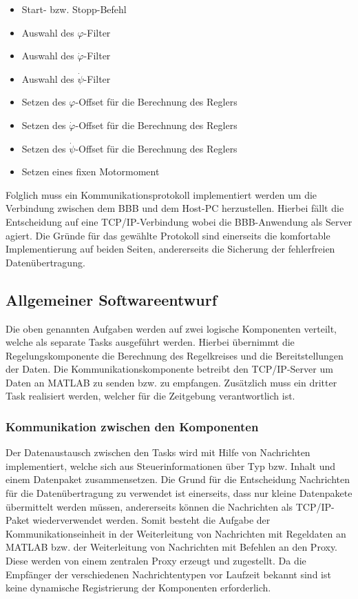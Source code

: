 \begin{itemize}
\setlength\itemsep{0em}
\item Start- bzw. Stopp-Befehl
\item Auswahl des $\varphi$-Filter
\item Auswahl des $\dot{\varphi}$-Filter
\item Auswahl des $\dot{\psi}$-Filter
\item Setzen des $\varphi$-Offset für die Berechnung des Reglers
\item Setzen des $\dot{\varphi}$-Offset für die Berechnung des Reglers
\item Setzen des $\dot{\psi}$-Offset für die Berechnung des Reglers
\item Setzen eines fixen Motormoment
\end{itemize}
Folglich muss ein Kommunikationsprotokoll implementiert werden um die Verbindung zwischen dem BBB und dem Host-PC herzustellen. Hierbei fällt die Entscheidung auf eine TCP/IP-Verbindung wobei die BBB-Anwendung als Server agiert. Die Gründe für das gewählte Protokoll sind einerseits die komfortable Implementierung auf beiden Seiten, andererseits die Sicherung der fehlerfreien Datenübertragung.

\subsection{Allgemeiner Softwareentwurf}
Die oben genannten Aufgaben werden auf zwei logische Komponenten verteilt, welche als separate Tasks ausgeführt werden. Hierbei übernimmt die Regelungskomponente die Berechnung des Regelkreises und die Bereitstellungen der Daten. Die Kommunikationskomponente betreibt den TCP/IP-Server um Daten an MATLAB zu senden bzw. zu empfangen. Zusätzlich muss ein dritter Task realisiert werden, welcher für die Zeitgebung verantwortlich ist. 

\subsubsection{Kommunikation zwischen den Komponenten}
Der Datenaustausch zwischen den Tasks wird mit Hilfe von Nachrichten implementiert, welche sich aus Steuerinformationen über Typ bzw. Inhalt und einem Datenpaket zusammensetzen. Die Grund für die Entscheidung Nachrichten für die Datenübertragung zu verwendet ist einerseits, dass nur kleine Datenpakete übermittelt werden müssen, andererseits können die Nachrichten als TCP/IP-Paket wiederverwendet werden. Somit besteht die Aufgabe der Kommunikationseinheit in der Weiterleitung von Nachrichten mit Regeldaten an MATLAB bzw. der Weiterleitung von Nachrichten mit Befehlen an den Proxy. Diese werden von einem zentralen Proxy erzeugt und zugestellt. Da die Empfänger der verschiedenen Nachrichtentypen vor Laufzeit bekannt sind ist keine dynamische Registrierung der Komponenten erforderlich.

